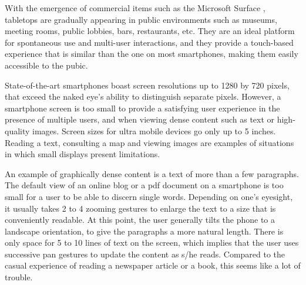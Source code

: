 With the emergence of commercial items such as the Microsoft Surface \citeyearpar{ms}, tabletops are gradually appearing in public environments such as museums, meeting rooms, public lobbies, bars, restaurants, etc.
They are an ideal platform for spontaneous use and multi-user interactions, and they provide a touch-based experience that is similar than the one on most smartphones, making them easily accessible to the pubic.\\
\linebreak
%
%

State-of-the-art smartphones boast screen resolutions up to 1280 by 720 pixels, that exceed the naked eye's ability to distinguish separate pixels.
However, a smartphone screen is too small to provide a satisfying user experience in the presence of multiple users, and when viewing dense content such as text or high-quality images.
Screen sizes for ultra mobile devices go only up to 5 inches.
Reading a text, consulting a map and viewing images are examples of situations in which small displays present limitations.

An example of graphically dense content is a text of more than a few paragraphs.
The default view of an online blog or a pdf document on a smartphone is too small for a user to be able to discern single words.
Depending on one's eyesight, it usually takes 2 to 4 zooming gestures to enlarge the text to a size that is conveniently readable.
At this point, the user generally tilts the phone to a landscape orientation, to give the paragraphs a more natural length.
There is only space for 5 to 10 lines of text on the screen, which implies that the user uses successive pan gestures to update the content as s/he reads.
Compared to the casual experience of reading a newspaper article or a book, this seems like a lot of trouble.

